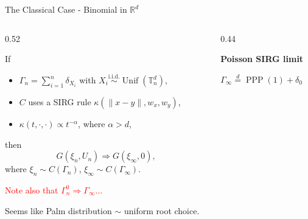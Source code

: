 \documentclass[aspectratio=169]{beamer}
\begin{document}
\begin{frame}{The Classical Case - Binomial in $\mathbb{R}^d$}
\begin{columns}[T,onlytextwidth]
    \begin{column}{0.52\textwidth}

        If
        \begin{itemize}
            \item $\Gamma_n = \sum_{i=1}^{n}\delta_{X_i}$ with
            $X_i \overset{\mathrm{i.i.d.}}{\sim} \operatorname{Unif}(\mathbb{T}^d_n)$,
            \item $C$ uses a SIRG rule $\kappa\!\left(\lVert x-y\rVert,w_x,w_y\right)$,
            \item $\kappa(t, \cdot, \cdot) \propto t^{-\alpha}$, where $\alpha>d$,
        \end{itemize}
        then
        $$
            G(\xi_n,U_n) \Rightarrow G(\xi_\infty,0),
        $$
        where $\xi_n \sim C(\Gamma_n)$, $\xi_\infty \sim C(\Gamma_\infty)$.
    
        \vspace{0.35cm}

        \textcolor{red}{Note also that $\Gamma^0_n \Rightarrow \Gamma_\infty...$}
        
        \vspace{0.35cm}

        Seems like Palm distribution $\sim$ uniform root choice.
    \end{column}
    \begin{column}{0.44\textwidth}
        \centering
        \resizebox{0.88\linewidth}{!}{}
        \par\vspace{0.12cm}
        \textbf{Poisson SIRG limit}
        \par\vspace{0.06cm}
        $\Gamma_\infty \overset{d}{=} \operatorname{PPP}(1)+\delta_0$
    \end{column}
\end{columns}
\end{frame}
\end{document}

